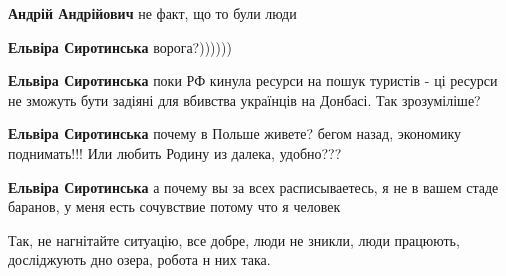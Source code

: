 \begin{itemize}
\begin{itemize}
\begin{itemize}
\textbf{Андрій Андрійович} не факт, що то були люди
\end{itemize}

 
\textbf{Ельвіра Сиротинська} ворога?))))))

 
\textbf{Ельвіра Сиротинська} поки РФ кинула ресурси на пошук туристів - ці ресурси не зможуть бути задіяні для вбивства українців на Донбасі.
Так зрозуміліше?

 
\textbf{Ельвіра Сиротинська} почему в Польше живете? бегом назад, экономику поднимать!!! Или любить Родину из далека, удобно???

 
\textbf{Ельвіра Сиротинська} а почему вы за всех расписываетесь, я не в вашем стаде баранов, у меня есть сочувствие потому что я человек

\end{itemize}

 

Так, не нагнітайте ситуацію, все добре, люди не зникли, люди працюють, досліджують дно озера, робота н них така.

\begin{itemize}
 

\end{itemize}
\end{itemize}

